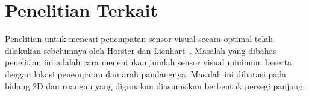 %
%
%
%
%
%
%

\section{Penelitian Terkait}
Penelitian untuk mencari penempatan sensor visual secara optimal telah dilakukan sebelumnya oleh Horster dan Lienhart~\cite{horster2006approximating}. Masalah yang dibahas penelitian ini adalah cara menentukan jumlah sensor visual minimum beserta dengan lokasi penempatan dan arah pandangnya. Masalah ini dibatasi pada bidang 2D dan ruangan yang digunakan diasumsikan berbentuk persegi panjang.

